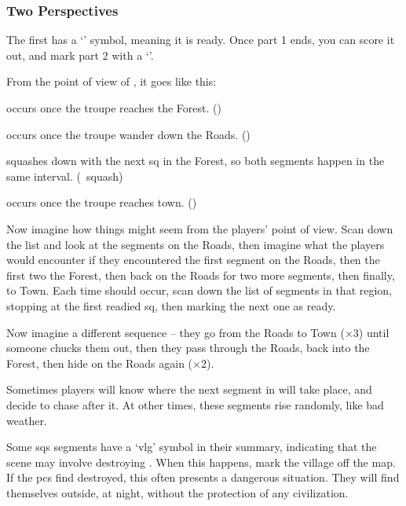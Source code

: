 \begin{multicols}{2}
\subsubsection{Two Perspectives}

The first has a `\sqr' symbol, meaning it is ready.
Once part 1 ends, you can score it out, and mark part 2 with a `\sqr'.

From the point of view of , it goes like this:

\begin{list}{\scshape Part }{}
  \item
  occurs once the troupe reaches the Forest. (\sqr)
  \item
  occurs once the troupe wander down the Roads. (\sqn)
  \item
  squashes down with the next \gls{sq} in the Forest, so both \glspl{segment} happen in the same \gls{interval}. (\sqn~\gls{squash})
  \item
  occurs once the troupe reaches town. (\sqn)
\end{list}


Now imagine how things might seem from the players' point of view.
Scan down the list  and look at the \glspl{segment} on the Roads, then imagine what the players would encounter if they encountered the first \gls{segment} on the Roads, then the first two the Forest, then back on the Roads for two more \glspl{segment}, then finally, to Town.
Each time  should occur, scan down the list of \glspl{segment} in that region, stopping at the first readied \gls{sq}, then marking the next one as ready.

Now imagine a different sequence -- they go from the Roads to Town ($\times 3$) until someone chucks them out, then they pass through the Roads, back into the Forest, then hide on the Roads again ($\times 2$).

Sometimes players will know where the next \gls{segment} in  will take place, and decide to chase after it.
At other times, these \glspl{segment} rise randomly, like bad weather.

Some \glspl{sq} \glspl{segment} have a `\gls{vlg}' symbol in their summary, indicating that the scene may involve destroying .
When this happens, mark the \gls{village} off the map.
If the \glspl{pc} find  destroyed, this often presents a dangerous situation.
They will find themselves outside, at night, without the protection of any civilization.


\end{multicols}
